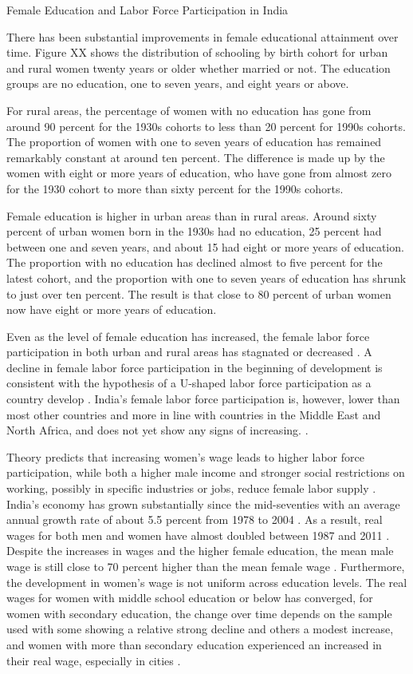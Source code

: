 Female Education and Labor Force Participation in India

There has been substantial improvements in female educational attainment over time.
Figure XX shows the distribution of schooling by birth cohort for urban and rural women 
twenty years or older whether married or not.
The education groups are no education, one to seven years, and eight years or
above.

For rural areas, the percentage of women with no education has gone from around 90 percent
for the 1930s cohorts to less than 20 percent for 1990s cohorts. 
The proportion of women with one to seven years of education has remained remarkably
constant at around ten percent.
The difference is made up by the women with eight or more years of education, who have
gone from almost zero for the 1930 cohort to more than sixty percent for the 1990s cohorts.

Female education is higher in urban areas than in rural areas.
Around sixty percent of urban women born in the 1930s had no education, 25 percent had
between one and seven years, and about 15 had eight or more years of education.
The proportion with no education has declined almost to five percent for the latest
cohort, and the proportion with one to seven years of education has shrunk to just over
ten percent.
The result is that close to 80 percent of urban women now have eight or more years of
education.


Even as the level of female education has increased, the female labor force participation 
in both urban and rural areas has stagnated or decreased
\citep{Klasen2015,Afridi2018,Bhargava2018, Chatterjee2018, Bhargava2019}.
A decline in female labor force participation in the beginning of development is
consistent with the hypothesis of a U-shaped labor force participation as a country
develop \citep{Goldin1994}.
India's female labor force participation is, however, lower than most other
countries and more in line with countries in the Middle East and North Africa, and
does not yet show any signs of increasing.
\citep{Klasen2015,Chatterjee2018}.

Theory predicts that increasing women's wage leads to higher labor force participation, 
while both a higher male income and stronger social restrictions on working, possibly in 
specific industries or jobs, reduce female labor supply \citep{Goldin1994}.
India's economy has grown substantially since the mid-seventies with
an average annual growth rate of about 5.5 percent from 1978 to 2004 \citet{Bosworth2008}.
As a result, real wages for both men and women have almost doubled between 1987 and 2011 
\citep{Klasen2015}.
Despite the increases in wages and the higher female education, the mean male wage is
still close to 70 percent higher than the mean female wage \citep{Bhargava2018}.
Furthermore, the development in women's wage is not uniform across education levels.
The real wages for women with middle school education or below has converged, 
for women with secondary education, the change over time depends on the sample used
with some showing a relative strong decline and others a modest increase,
and women with more than secondary education experienced an increased in their real 
wage, especially in cities \citep{Klasen2015,Bhargava2018}.

